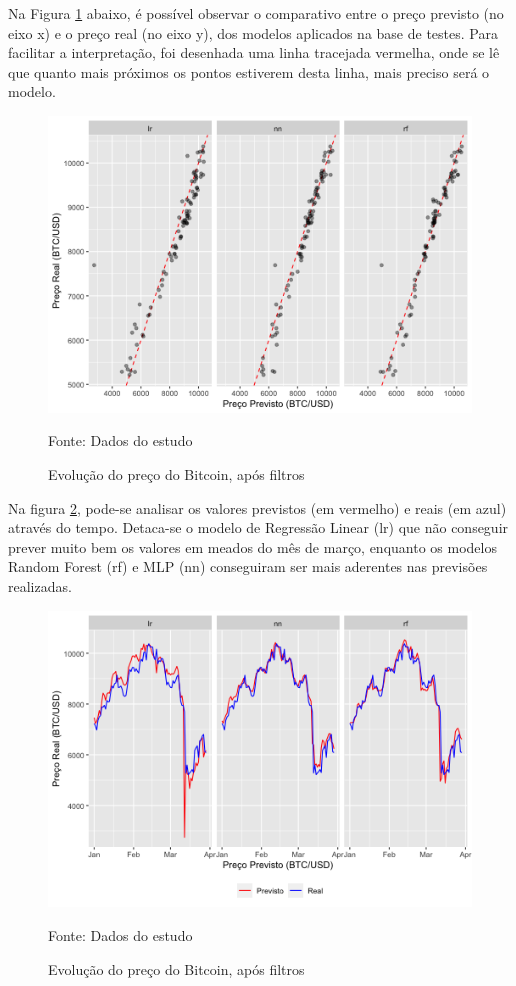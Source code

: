\documentclass[12pt]{article}
\begin{document}
Na Figura \ref{fig:results_scatter} abaixo, é possível observar o comparativo
entre o preço previsto (no eixo x) e o preço real (no eixo y), dos modelos 
aplicados na base de testes. Para facilitar a interpretação, foi desenhada uma 
linha tracejada vermelha, onde se lê que quanto mais próximos os pontos estiverem
desta linha, mais preciso será o modelo.

\begin{figure}[!ht]
  \centering
  \includegraphics[scale = 0.8]{img/results_scatter.png}
  \caption{Evolução do preço do Bitcoin, após filtros}
  Fonte: Dados do estudo
  \label{fig:results_scatter}
\end{figure}


Na figura \ref{fig:results_line}, pode-se analisar os valores previstos (em vermelho)
e reais (em azul) através do tempo. Detaca-se o modelo de Regressão Linear (lr)
que não conseguir prever muito bem os valores em meados do mês de março, enquanto
os modelos Random Forest (rf) e MLP (nn) conseguiram ser mais aderentes nas 
previsões realizadas.


\begin{figure}[!ht]
  \centering
  \includegraphics[scale = 0.8]{img/results_line.png}
  \caption{Evolução do preço do Bitcoin, após filtros}
  Fonte: Dados do estudo
  \label{fig:results_line}
\end{figure}
\end{document}
